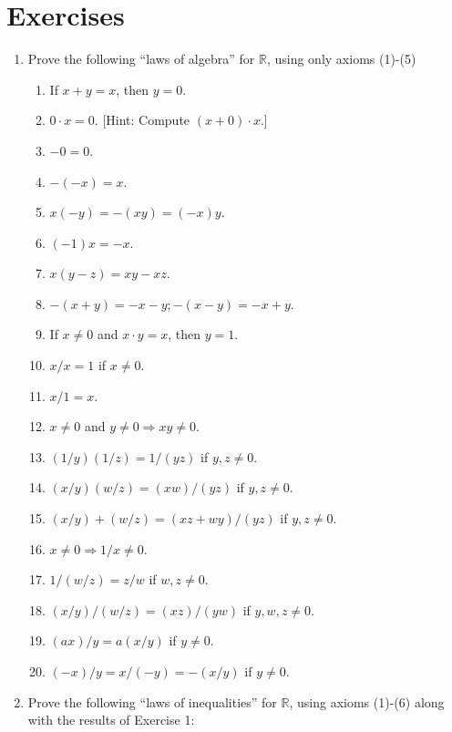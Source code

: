 \section*{Exercises}
\begin{enumerate}[itemsep=0.4em, parsep=0pt, topsep=0pt, partopsep=0pt, leftmargin=*, label=\arabic*., ref=\arabic*]
\item Prove the following ``laws of algebra'' for \(\mathbb{R}\), using only axioms (1)-(5)
  \begin{enumerate}[itemsep=0.2em, parsep=0pt, topsep=0pt, partopsep=0pt, leftmargin=*, label=(\alph*), align=left]
  \item If \(x + y = x\), then \(y = 0\).
  \item \(0 \cdot x = 0\). [Hint: Compute \(({x + 0}) \cdot x\).]
  \item \(- 0 = 0\).
  \item \(- ({-x}) = x\).
  \item \(x({-y}) = - ({xy}) = ({-x}) y\).
  \item \(({-1}) x = - x\).
  \item \(x({y - z}) = {xy} - {xz}\).
  \item \(- ({x + y}) = - x - y; - ({x - y}) = - x + y\).
  \item If \(x \neq 0\) and \(x \cdot y = x\), then \(y = 1\).
  \item \(x/x = 1\) if \(x \neq 0\).
  \item \(x/1 = x\).
  \item \(x \neq 0\) and \(y \neq 0 \Rightarrow {xy} \neq 0\).
  \item \(({1/y}) ({1/z}) = 1/({yz})\) if \(y,z \neq 0\).
  \item \(({x/y}) ({w/z}) = ({xw}) /({yz})\) if \(y,z \neq 0\).
  \item \(({x/y}) + ({w/z}) = ({{xz} + {wy}}) /({yz})\) if \(y,z \neq 0\).
  \item \(x \neq 0 \Rightarrow 1/x \neq 0\).
  \item \(1/({w/z}) = z/w\) if \(w,z \neq 0\).
  \item \(({x/y}) /({w/z}) = ({xz}) /({yw})\) if \(y,w,z \neq 0\).
  \item \(({ax}) /y = a({x/y})\) if \(y \neq 0\).
  \item \(({-x}) /y = x/({-y}) = - ({x/y})\) if \(y \neq 0\).
  \end{enumerate}
\item Prove the following ``laws of inequalities'' for \(\mathbb{R}\), using axioms (1)-(6) along with the results of Exercise 1:

\end{enumerate}
